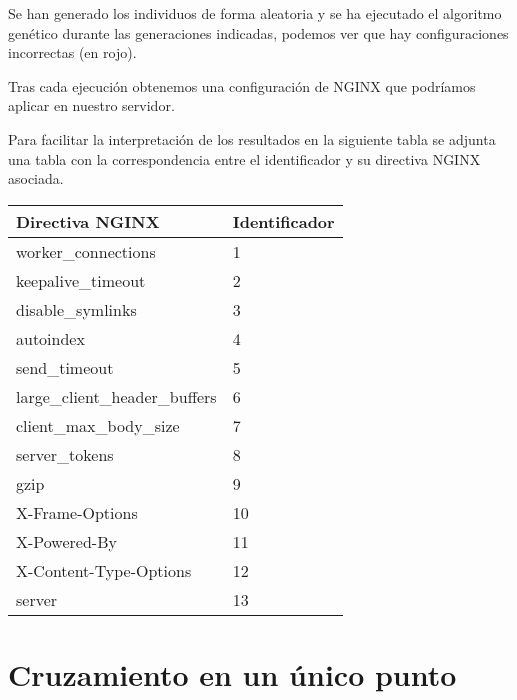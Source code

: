 \bigskip
Se han generado los individuos de forma aleatoria y se ha ejecutado el algoritmo genético durante las generaciones indicadas, podemos ver que hay configuraciones incorrectas (en rojo).

\bigskip
Tras cada ejecución obtenemos una configuración de NGINX que podríamos aplicar en nuestro servidor.

\bigskip
Para facilitar la interpretación de los resultados en la siguiente tabla se adjunta una tabla con la correspondencia entre el identificador y su directiva NGINX asociada.

\begin{table}[H]
\begin{tabular}{|l|l|}
\hline
\textbf{Directiva NGINX}       & \textbf{Identificador} \\ \hline
worker\_connections            & 1                      \\ \hline
keepalive\_timeout             & 2                      \\ \hline
disable\_symlinks              & 3                      \\ \hline
autoindex                      & 4                      \\ \hline
send\_timeout                  & 5                      \\ \hline
large\_client\_header\_buffers & 6                      \\ \hline
client\_max\_body\_size        & 7                      \\ \hline
server\_tokens                 & 8                      \\ \hline
gzip                           & 9                      \\ \hline
X-Frame-Options                & 10                     \\ \hline
X-Powered-By                   & 11                     \\ \hline
X-Content-Type-Options         & 12                     \\ \hline
server                         & 13                     \\ \hline
\end{tabular}
\end{table}

\section{Cruzamiento en un único punto}

